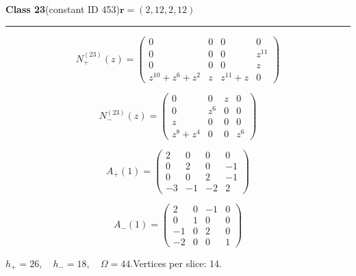 \noindent\begin{minipage}{\linewidth}
\noindent\textbf{Class 23}\quad\small (constant ID 453)\hfill $\symbf{r}=(2,12,2,12)$
\par\smallskip\noindent\textcolor{rulegray}{\rule{\linewidth}{0.3pt}}
\begin{minipage}[c]{0.495\linewidth}\centering\fontsize{9.7}{12}\selectfont
\setlength{\abovedisplayskip}{4pt}\setlength{\belowdisplayskip}{4pt}
\setlength{\abovedisplayshortskip}{4pt}\setlength{\belowdisplayshortskip}{4pt}
\setlength{\arraycolsep}{3pt}\renewcommand{\arraystretch}{1.08}
\[N_{+}^{(23)}(z)=\begin{pmatrix}0 & 0 & 0 & 0\\0 & 0 & 0 & z^{11}\\0 & 0 & 0 & z\\z^{10} + z^{6} + z^{2} & z & z^{11} + z & 0\end{pmatrix}\]
\end{minipage}%
\begin{minipage}[c]{0.495\linewidth}\centering\fontsize{9.7}{12}\selectfont
\setlength{\abovedisplayskip}{4pt}\setlength{\belowdisplayskip}{4pt}
\setlength{\abovedisplayshortskip}{4pt}\setlength{\belowdisplayshortskip}{4pt}
\setlength{\arraycolsep}{3pt}\renewcommand{\arraystretch}{1.08}
\[N_{-}^{(23)}(z)=\begin{pmatrix}0 & 0 & z & 0\\0 & z^{6} & 0 & 0\\z & 0 & 0 & 0\\z^{8} + z^{4} & 0 & 0 & z^{6}\end{pmatrix}\]
\end{minipage}%
\par\noindent
\begin{minipage}[c]{0.495\linewidth}\centering\fontsize{9.7}{12}\selectfont
\setlength{\abovedisplayskip}{4pt}\setlength{\belowdisplayskip}{4pt}
\setlength{\abovedisplayshortskip}{4pt}\setlength{\belowdisplayshortskip}{4pt}
\setlength{\arraycolsep}{3pt}\renewcommand{\arraystretch}{1.08}
\[A_{+}(1)=\begin{pmatrix}2 & 0 & 0 & 0\\0 & 2 & 0 & -1\\0 & 0 & 2 & -1\\-3 & -1 & -2 & 2\end{pmatrix}\]
\end{minipage}%
\begin{minipage}[c]{0.495\linewidth}\centering\fontsize{9.7}{12}\selectfont
\setlength{\abovedisplayskip}{4pt}\setlength{\belowdisplayskip}{4pt}
\setlength{\abovedisplayshortskip}{4pt}\setlength{\belowdisplayshortskip}{4pt}
\setlength{\arraycolsep}{3pt}\renewcommand{\arraystretch}{1.08}
\[A_{-}(1)=\begin{pmatrix}2 & 0 & -1 & 0\\0 & 1 & 0 & 0\\-1 & 0 & 2 & 0\\-2 & 0 & 0 & 1\end{pmatrix}\]
\end{minipage}%
\par\smallskip\noindent\small $h_+=26,\quad h_-=18,\quad \Omega=44.$\quad Vertices per slice: 14.
\end{minipage}\par\vfill
\clearpage
